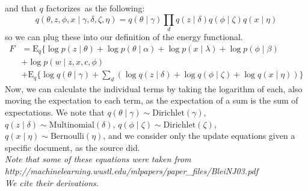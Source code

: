 \documentclass[12pt]{article}
\begin{document}
and that $q$ factorizes\ as the following:
\begin{equation*}
q(\theta, z, \phi, x \mid \gamma, \delta, \zeta, \eta) = q(\theta \mid \gamma) \prod_d q(z \mid \delta) q(\phi \mid \zeta) q(x \mid \eta)
\end{equation*}
so we can plug these into our definition of the energy functional.
\begin{align*}
F &= \mathrm{E}_q \{\log p(z \mid \theta) + \log p(\theta \mid \alpha) + \log p(x \mid \lambda) + \log p(\phi \mid \beta) \\
&+ \log p(w \mid z, x, c, \phi) \\
&+ \mathrm{E}_q \{ \log q(\theta \mid \gamma) + \sum_d \left( \log q(z \mid \delta) + \log q(\phi \mid \zeta) + \log q(x \mid \eta) \right) \} 
\end{align*}
Now, we can calculate the individual terms by taking the logarithm of each, also moving the expectation to each term, as the expectation of a sum is the sum of expectations.  We note that $q(\theta \mid \gamma) \sim \mathrm{Dirichlet}(\gamma)$, $q(z \mid \delta) \sim \mathrm{Multinomial}(\delta)$, $q(\phi \mid \zeta) \sim \mathrm{Dirichlet}(\zeta)$, $q(x \mid \eta) \sim \mathrm{Bernoulli}(\eta)$, and we consider only the update equations given a specific document, as the source did.\\
\noindent \textit{Note that some of these equations were taken from\\ http://machinelearning.wustl.edu/mlpapers/paper\_files/BleiNJ03.pdf \\ We cite their derivations.}
\end{document}
